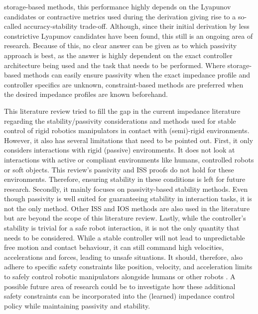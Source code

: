 storage-based methods, this performance highly depends on the Lyapunov candidates or contractive metrics used during the derivation giving rise to a so-called accuracy-stability trade-off. Although, since their initial derivation by \cite{kronanderStabilityConsiderationsVariable2016} less constrictive Lyapunov candidates have been found, this still is an ongoing area of research. Because of this, no clear answer can be given as to which passivity approach is best, as the answer is highly dependent on the exact controller architecture being used and the task that needs to be performed. Where storage-based methods can easily ensure passivity when the exact impedance profile and controller specifics are unknown, constraint-based methods are preferred when the desired impedance profiles are known beforehand.

This literature review tried to fill the gap in the current impedance literature regarding the stability/passivity considerations and methods used for stable control of rigid robotics manipulators in contact with (semi)-rigid environments. However, it also has several limitations that need to be pointed out. First, it only considers interactions with rigid (passive) environments. It does not look at interactions with active or compliant environments like humans, controlled robots or soft objects. This review's passivity and ISS proofs do not hold for these environments. Therefore, ensuring stability in these conditions is left for future research. Secondly, it mainly focuses on passivity-based stability methods. Even though passivity is well suited for guaranteeing stability in interaction tasks, it is not the only method. Other ISS and IOS methods are also used in the literature but are beyond the scope of this literature review. Lastly, while the controller's stability is trivial for a safe robot interaction, it is not the only quantity that needs to be considered. While a stable controller will not lead to unpredictable free motion and contact behaviour, it can still command high velocities, accelerations and forces, leading to unsafe situations. It should, therefore, also adhere to specific safety constraints like position, velocity, and acceleration limits to safely control robotic manipulators alongside humans or other robots \cite{lasotaSurveyMethodsSafe2017,chowLyapunovbasedApproachSafe2018,sadanandananandSafeLearningControl2021,sharkawyHumanRobotInteraction2022}. A possible future area of research could be to investigate how these additional safety constraints can be incorporated into the (learned) impedance control policy while maintaining passivity and stability.
